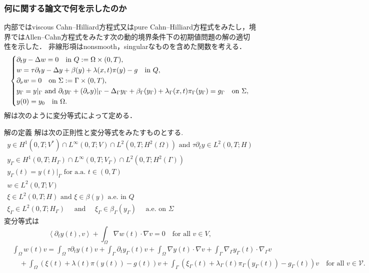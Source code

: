 \documentclass[openary, a4paper, oneside]{jsarticle}
\begin{document}
	\subsubsection{何に関する論文で何を示したのか}
	内部ではviscous Cahn--Hilliard方程式又はpure Cahn--Hilliard方程式をみたし，境界ではAllen--Cahn方程式をみたす次の動的境界条件下の初期値問題の解の適切性を示した．
	非線形項はnonsmooth，singularなものを含めた関数を考える．
	\begin{equation}\left\{\begin{aligned}
		&\partial_t y - \Delta w = 0 \quad\text{in }Q:=\Omega\times(0,T),\\
		&w = \tau\partial_t y - \Delta y + \beta(y) + \lambda(x,t)\pi(y) - g \quad \text{in }Q,\\
		&\partial_{\nu} w = 0 \quad\text{on }\Sigma:=\Gamma\times(0,T),\\
		&y_{\Gamma} = y|_{\Gamma} \text{ and }\partial_t y_{\Gamma} + (\partial_{\nu} y)|_{\Gamma} - \Delta_{\Gamma} y_{\Gamma} + \beta_{\Gamma}(y_{\Gamma}) + \lambda_{\Gamma}(x,t)\pi_{\Gamma}(y_{\Gamma}) = g_{\Gamma} \quad \text{on }\Sigma,\\
		&y(0) = y_0 \quad \text{in } \Omega.
	\end{aligned}\right.\end{equation}
	解は次のように変分等式によって定める．
	\begin{itembox}[l]{解の定義}
		解は次の正則性と変分等式をみたすものとする.
		\begin{gather}
			{y \in H^{1}\left(0, T ; V^{*}\right) \cap L^{\infty}(0, T ; V) \cap L^{2}\left(0, T ; H^{2}(\Omega)\right) \text { and } \tau \partial_{t} y \in L^{2}(0, T ; H)} \\ {y_{\Gamma} \in H^{1}\left(0, T ; H_{\Gamma}\right) \cap L^{\infty}\left(0, T ; V_{\Gamma}\right) \cap L^{2}\left(0, T ; H^{2}(\Gamma)\right)} \\ {y_{\Gamma}(t)=\left.y(t)\right|_{\Gamma} \text { for a.a. } t \in(0, T)} \\ {w \in L^{2}(0, T ; V)} \\ {\xi \in L^{2}(0, T ; H) \text { and } \xi \in \beta(y) \text { a.e. in } Q} \\ {\xi_{\Gamma} \in L^{2}\left(0, T ; H_{\Gamma}\right) \quad \text { and } \quad \xi_{\Gamma} \in \beta_{\Gamma}\left(y_{\Gamma}\right) \quad \text { a.e. on } \Sigma}
		\end{gather}
		変分等式は
		\begin{equation}
			\left\langle\partial_{t} y(t), v\right\rangle +\int_{\Omega} \nabla w(t) \cdot \nabla v=0 \quad \text{for all }v\in V,
		\end{equation}
		\begin{equation}\begin{aligned}
			&\int_{\Omega} w(t) v=\int_{\Omega} \tau \partial_{t} y(t) v+\int_{\Gamma} \partial_{t} y_{\Gamma}(t) v+\int_{\Omega} \nabla y(t) \cdot \nabla v+\int_{\Gamma} \nabla_{\Gamma} y_{\Gamma}(t) \cdot \nabla_{\Gamma} v \\
			&\quad +\int_{\Omega}(\xi(t)+\lambda(t) \pi(y(t))-g(t)) v+\int_{\Gamma}\left(\xi_{\Gamma}(t)+\lambda_{\Gamma}(t) \pi_{\Gamma}\left(y_{\Gamma}(t)\right)-g_{\Gamma}(t)\right) v \quad\text{for all }v\in \mathcal{V}.
		\end{aligned}\end{equation}
	\end{itembox}
\end{document}
